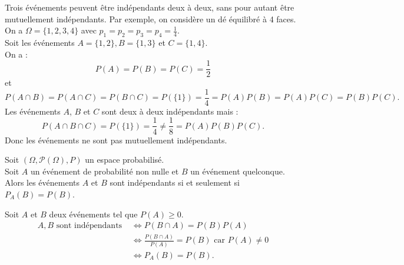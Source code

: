 \documentclass{book}
\begin{document}
\begin{Remarque}
Trois événements peuvent être indépendants deux à deux, sans pour autant être mutuellement indépendants. 
Par exemple, on considère un dé équilibré à 4 faces. On a $\Omega=\{1,2,3,4\}$ avec $p_1=p_2=p_3=p_4=\frac 1 4$.\\
Soit les événements $A=\{1,2\}, B=\{1,3\}$ et $C=\{1,4\}.$\\
On a : $$P(A)=P(B)=P(C)=\frac 1 2$$ et $$P(A\cap B)=P(A\cap C)=P(B\cap C)=P(\{1\})=\frac 1 4 =P(A)P(B)=P(A)P(C)=P(B)P(C).$$
Les événements $A$, $B$ et $C$ sont deux à deux indépendants mais :
 $$P(A\cap B\cap C )= P(\{1\})=\frac 1 4 \neq  \frac 1 8 =  P(A)P(B)P(C).$$
 Donc les événements ne sont pas mutuellement indépendants.
\end{Remarque}
\begin{Proposition}
Soit $(\Omega,\mathcal{P}(\Omega),P)$ un espace probabilisé.\\
Soit $A$ un événement de probabilité non nulle
et $B$ un événement quelconque.\\
Alors les événements $A$ et $B$ sont indépendants si et seulement si $P_A(B)=P(B)$.
\end{Proposition}
\begin{Demonstration}
Soit $A$ et $B$ deux événements tel que $P(A)\geq 0$.\\
$$\begin{aligned}
A, B \text{ sont indépendants } & \Leftrightarrow P(B\cap A)=P(B)P(A)\\
& \Leftrightarrow \frac{P(B\cap A)}{P(A)}=P(B) \text{ car }P(A)\neq 0\\
& \Leftrightarrow P_A(B)=P(B).
\end{aligned}$$ 
\end{Demonstration}




\end{document}
